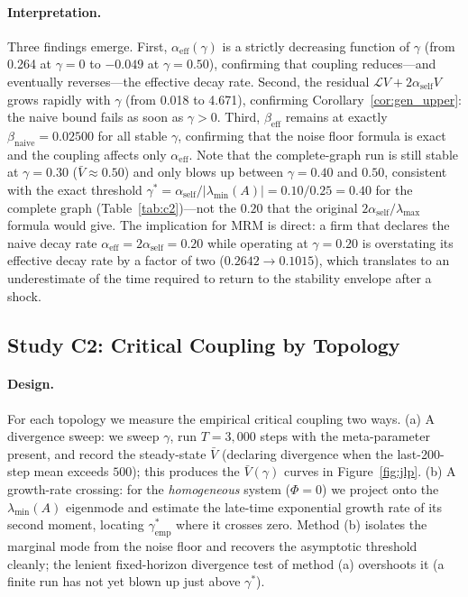 \documentclass[12pt]{article}
\theoremstyle{plain}
\theoremstyle{definition}
\newcommand{\Lgen}{\mathcal{L}}
\newcommand{\abs}[1]{\left| #1 \right|}
\begin{document}
\paragraph{Interpretation.}
Three findings emerge.  First, $\alpha_{\mathrm{eff}}(\gamma)$ is a
strictly decreasing function of $\gamma$ (from 0.264 at $\gamma=0$ to
$-0.049$ at $\gamma=0.50$), confirming that coupling reduces---and
eventually reverses---the effective decay rate.  Second, the residual
$\Lgen V + 2\alpha_{\mathrm{self}} V$ grows rapidly with $\gamma$
(from 0.018 to 4.671), confirming Corollary~\ref{cor:gen_upper}: the
naive bound fails as soon as $\gamma > 0$.  Third, $\beta_{\mathrm{eff}}$
remains at exactly $\beta_{\mathrm{naive}} = 0.02500$ for all stable
$\gamma$, confirming that the noise floor formula is exact and the
coupling affects only $\alpha_{\mathrm{eff}}$.  Note that the complete-graph
run is still stable at $\gamma=0.30$ ($\bar V\approx0.50$) and only blows up
between $\gamma=0.40$ and $0.50$, consistent with the exact threshold
$\gamma^*=\alpha_{\mathrm{self}}/\abs{\lambda_{\min}(A)}=0.10/0.25=0.40$ for
the complete graph (Table~\ref{tab:c2})---not the $0.20$ that the original
$2\alpha_{\mathrm{self}}/\lambda_{\max}$ formula would give.  The implication
for MRM is direct: a firm that declares the naive decay rate
$\alpha_{\mathrm{eff}} = 2\alpha_{\mathrm{self}} = 0.20$ while operating at
$\gamma = 0.20$ is overstating its effective decay rate by a factor of two
($0.2642 \to 0.1015$), which translates to an underestimate of the time
required to return to the stability envelope after a shock.

\subsection{Study C2: Critical Coupling by Topology}

\paragraph{Design.}
For each topology we measure the empirical critical coupling two ways.
(a) A divergence sweep: we sweep $\gamma$, run $T=3{,}000$ steps with the
meta-parameter present, and record the steady-state $\bar V$ (declaring
divergence when the last-200-step mean exceeds $500$); this produces the
$\bar V(\gamma)$ curves in Figure~\ref{fig:jlp}.  (b) A growth-rate
crossing: for the \emph{homogeneous} system ($\Phi=0$) we project onto the
$\lambda_{\min}(A)$ eigenmode and estimate the late-time exponential growth
rate of its second moment, locating $\gamma^*_{\mathrm{emp}}$ where it
crosses zero.  Method (b) isolates the marginal mode from the noise floor
and recovers the asymptotic threshold cleanly; the lenient fixed-horizon
divergence test of method (a) overshoots it (a finite run has not yet blown
up just above $\gamma^*$).
\end{document}
